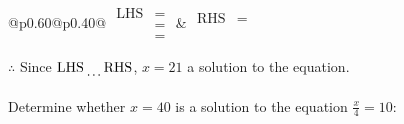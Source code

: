 \documentclass[12pt]{article}
\newcounter{minipagecount}
\begin{document}
\begin{multicols}{2}
\begin{minipage}[t]{0.40\textwidth}
    \noindent
    \renewcommand{\arraystretch}{1.3} %
    \begin{tabular}{@{}p{0.60\linewidth}@{}p{0.40\linewidth}@{}}
        \(\begin{aligned}
            \text{LHS} &=  \\
                    &=  \\
                    &= 
        \end{aligned}\) &
        \(\begin{aligned}
            \text{RHS} &= \\
                    & \\
                    &
        \end{aligned}\)
    \end{tabular}
    \renewcommand{\arraystretch}{1.0} %
    \vspace{2pt}  %

    \noindent \(\therefore\) Since \(\text{LHS} \dotuline{\hspace{5mm}} \text{RHS}\), \(x = 21\) \dotuline{\hspace{12mm}} a solution to the equation.

\end{minipage}

\vspace*{0.5ex}
\vfill{}
\noindent{(\theminipagecount)}\hspace{0.1mm} %
\begin{minipage}[t]{0.40\textwidth} %

    \noindent Determine whether \(x = 40\) is a solution to the equation \(\frac{x}{4} = 10\):
    \vspace{2pt}  %


\end{minipage}
\end{multicols}
\end{document}
